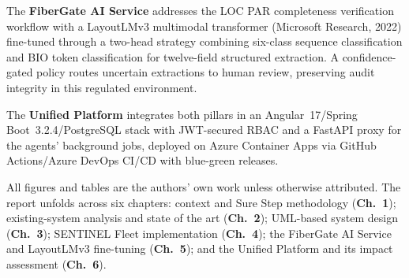 The \textbf{FiberGate AI Service} addresses the LOC PAR completeness verification workflow with a LayoutLMv3 multimodal transformer (Microsoft Research, 2022) fine-tuned through a two-head strategy combining six-class sequence classification and BIO token classification for twelve-field structured extraction. A confidence-gated policy routes uncertain extractions to human review, preserving audit integrity in this regulated environment.

The \textbf{Unified Platform} integrates both pillars in an Angular~17/Spring Boot~3.2.4/PostgreSQL stack with JWT-secured RBAC and a FastAPI proxy for the agents' background jobs, deployed on Azure Container Apps via GitHub Actions/Azure DevOps CI/CD with blue-green releases.

All figures and tables are the authors' own work unless otherwise attributed. The report unfolds across six chapters: context and Sure Step methodology (\textbf{Ch.~1}); existing-system analysis and state of the art (\textbf{Ch.~2}); UML-based system design (\textbf{Ch.~3}); SENTINEL Fleet implementation (\textbf{Ch.~4}); the FiberGate AI Service and LayoutLMv3 fine-tuning (\textbf{Ch.~5}); and the Unified Platform and its impact assessment (\textbf{Ch.~6}).
